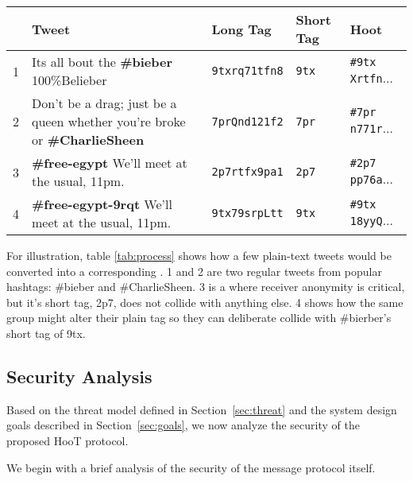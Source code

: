 \begin{table*}
\caption{This table shows how an individual tweet would become a \hoot by noting the Long Tag, Short Tag, and the final \hoot. Tweet 4 shows how a rebellion group could collide with \#bieber and disguise it's messages.
\label{tab:process}
}
\begin{center}
    \begin{tabular}{ l  l  l  l  l }
	 & Tweet & Long Tag & Short Tag & Hoot \\ \hline
	1 & Its all bout the {\bf \#bieber} 100\%Belieber                                 & {\tt 9txrq71tfn8} &  {\tt 9tx} & {\tt \#9tx Xrtfn}... \\
	2 & Don't be a drag; just be a queen whether you're broke or {\bf \#CharlieSheen} & {\tt 7prQnd121f2} & {\tt 7pr} & {\tt \#7pr n771r}... \\
	3 & {\bf \#free-egypt} We'll meet at the usual, 11pm.                             & {\tt 2p7rtfx9pa1} & {\tt 2p7} & {\tt \#2p7 pp76a}... \\
	4 & {\bf \#free-egypt-9rqt} We'll meet at the usual, 11pm.                        & {\tt 9tx79srpLtt} &  {\tt 9tx}  & {\tt \#9tx 18yyQ}... \\
    \end{tabular}
\end{center}
\end{table*}

For illustration, table \ref{tab:process} shows how a few plain-text tweets would be converted into a corresponding \hoot. 1 and 2 are two regular tweets from popular hashtags: \#bieber and \#CharlieSheen. 3 is a \hoot where receiver anonymity is critical, but it's short tag, 2p7, does not collide with anything else. 4 shows how the same group might alter their plain tag so they can deliberate collide with \#bierber's short tag of 9tx.


\subsection{Security Analysis}
\label{sec:security}

Based on the threat model defined in Section~\ref{sec:threat} and the
system design goals described in Section~\ref{sec:goals}, we now analyze
the security of the proposed HooT protocol.

%
We begin with a brief analysis of the security of the message protocol
itself.

